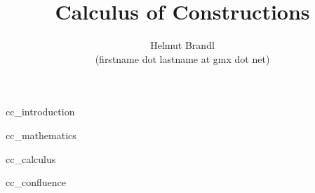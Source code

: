 \documentclass[12pt]{article}
\begin{document}


\title{Calculus of Constructions}
\author{Helmut Brandl \\ \scriptsize (firstname dot lastname at gmx dot net)}
\date{}

\maketitle

\abstract{
}



\tableofcontents

 {cc_introduction}

 {cc_mathematics}

 {cc_calculus}

 {cc_confluence}






\end{document}

